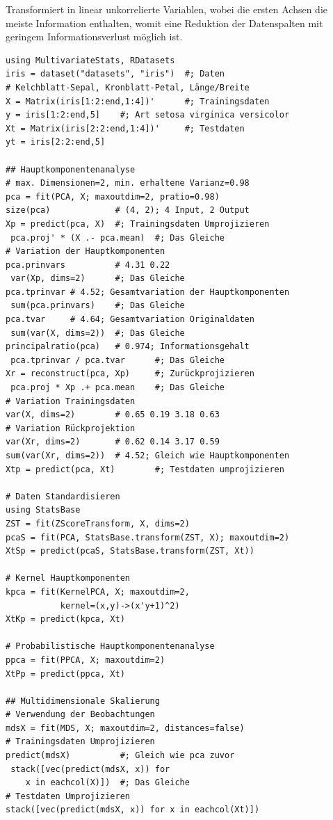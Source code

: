 \documentclass[10pt,twocolumn]{scrartcl}
\begin{document}
Transformiert in linear unkorrelierte Variablen, wobei die ersten Achsen die
meiste Information enthalten, womit eine Reduktion der Datenspalten mit geringem
Informationsverlust möglich ist.

\begin{lstlisting}
using MultivariateStats, RDatasets
iris = dataset("datasets", "iris")  #; Daten
# Kelchblatt-Sepal, Kronblatt-Petal, Länge/Breite
X = Matrix(iris[1:2:end,1:4])'      #; Trainingsdaten
y = iris[1:2:end,5]    #; Art setosa virginica versicolor
Xt = Matrix(iris[2:2:end,1:4])'     #; Testdaten
yt = iris[2:2:end,5]

## Hauptkomponentenanalyse
# max. Dimensionen=2, min. erhaltene Varianz=0.98
pca = fit(PCA, X; maxoutdim=2, pratio=0.98)
size(pca)             # (4, 2); 4 Input, 2 Output
Xp = predict(pca, X)  #; Trainingsdaten Umprojizieren
 pca.proj' * (X .- pca.mean)  #; Das Gleiche
# Variation der Hauptkomponenten
pca.prinvars          # 4.31 0.22
 var(Xp, dims=2)      #; Das Gleiche
pca.tprinvar # 4.52; Gesamtvariation der Hauptkomponenten
 sum(pca.prinvars)    #; Das Gleiche
pca.tvar     # 4.64; Gesamtvariation Originaldaten
 sum(var(X, dims=2))  #; Das Gleiche
principalratio(pca)   # 0.974; Informationsgehalt
 pca.tprinvar / pca.tvar      #; Das Gleiche
Xr = reconstruct(pca, Xp)     #; Zurückprojizieren
 pca.proj * Xp .+ pca.mean    #; Das Gleiche
# Variation Trainingsdaten
var(X, dims=2)        # 0.65 0.19 3.18 0.63
# Variation Rückprojektion
var(Xr, dims=2)       # 0.62 0.14 3.17 0.59
sum(var(Xr, dims=2))  # 4.52; Gleich wie Hauptkomponenten
Xtp = predict(pca, Xt)        #; Testdaten umprojizieren

# Daten Standardisieren
using StatsBase
ZST = fit(ZScoreTransform, X, dims=2)
pcaS = fit(PCA, StatsBase.transform(ZST, X); maxoutdim=2)
XtSp = predict(pcaS, StatsBase.transform(ZST, Xt))

# Kernel Hauptkomponenten
kpca = fit(KernelPCA, X; maxoutdim=2,
           kernel=(x,y)->(x'y+1)^2)
XtKp = predict(kpca, Xt)

# Probabilistische Hauptkomponentenanalyse
ppca = fit(PPCA, X; maxoutdim=2)
XtPp = predict(ppca, Xt)

## Multidimensionale Skalierung
# Verwendung der Beobachtungen
mdsX = fit(MDS, X; maxoutdim=2, distances=false)
# Trainingsdaten Umprojizieren
predict(mdsX)          #; Gleich wie pca zuvor
 stack([vec(predict(mdsX, x)) for
    x in eachcol(X)])  #; Das Gleiche
# Testdaten Umprojizieren
stack([vec(predict(mdsX, x)) for x in eachcol(Xt)])


\end{lstlisting}
\end{document}
